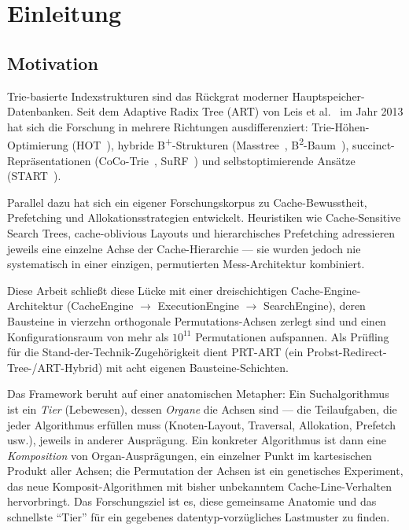 \chapter{Einleitung}\label{ch:intro}

\section{Motivation}\label{sec:motivation}

Trie-basierte Indexstrukturen sind das Rückgrat moderner Hauptspeicher-Datenbanken. Seit
dem Adaptive Radix Tree (ART) von Leis et al.~\cite{leis2013art} im Jahr 2013 hat sich die
Forschung in mehrere Richtungen ausdifferenziert: Trie-Höhen-Optimierung
(HOT~\cite{binna2018hot}), hybride B\textsuperscript{+}-Strukturen
(Masstree~\cite{mao2012masstree}, B\textsuperscript{2}-Baum~\cite{schmeisser2022b2tree}),
succinct-Repräsentationen (CoCo-Trie~\cite{boffa2024coco}, SuRF~\cite{zhang2018surf}) und
selbstoptimierende Ansätze (START~\cite{fent2020start}).

Parallel dazu hat sich ein eigener Forschungskorpus zu Cache-Bewusstheit, Prefetching und
Allokationsstrategien entwickelt. Heuristiken wie Cache-Sensitive Search Trees,
cache-oblivious Layouts und hierarchisches Prefetching adressieren jeweils eine einzelne
Achse der Cache-Hierarchie --- sie wurden jedoch nie systematisch in einer einzigen,
permutierten Mess-Architektur kombiniert.

Diese Arbeit schließt diese Lücke mit einer dreischichtigen Cache-Engine-Architektur
(CacheEngine $\to$ ExecutionEngine $\to$ SearchEngine), deren Bausteine in vierzehn
orthogonale Permutations-Achsen zerlegt sind und einen Konfigurationsraum von mehr als
$10^{11}$ Permutationen aufspannen. Als Prüfling für die Stand-der-Technik-Zugehörigkeit
dient PRT-ART (ein Probst-Redirect-Tree-/ART-Hybrid) mit acht eigenen Bausteine-Schichten.

Das Framework beruht auf einer anatomischen Metapher: Ein Suchalgorithmus ist ein
\emph{Tier} (Lebewesen), dessen \emph{Organe} die Achsen sind --- die Teilaufgaben, die
jeder Algorithmus erfüllen muss (Knoten-Layout, Traversal, Allokation, Prefetch usw.),
jeweils in anderer Ausprägung. Ein konkreter Algorithmus ist dann eine \emph{Komposition}
von Organ-Ausprägungen, ein einzelner Punkt im kartesischen Produkt aller Achsen; die
Permutation der Achsen ist ein genetisches Experiment, das neue Komposit-Algorithmen mit
bisher unbekanntem Cache-Line-Verhalten hervorbringt. Das Forschungsziel ist es, diese
gemeinsame Anatomie und das schnellste ``Tier'' für ein gegebenes datentyp-vorzügliches
Lastmuster zu finden.

